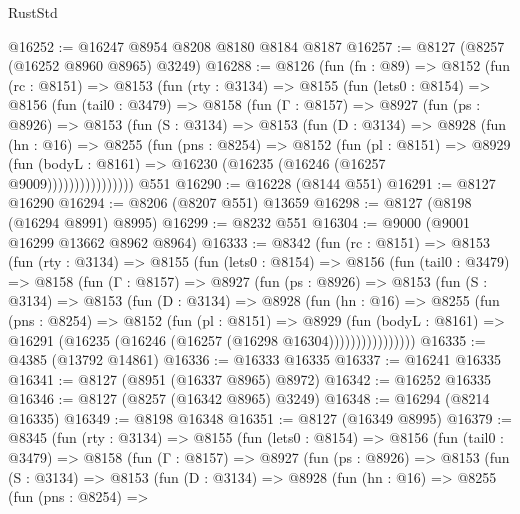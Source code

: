 \begin{lexlean}{RustStd}
\begin{coremodule}
@16252 := @16247 @8954 @8208 @8180 @8184 @8187
@16257 := @8127 (@8257 (@16252 @8960 @8965) @3249)
@16288 := @8126
    (fun (fn : @89) =>
    @8152
      (fun (rc : @8151) =>
      @8153
        (fun (rty : @3134) =>
        @8155
          (fun (lets0 : @8154) =>
          @8156
            (fun (tail0 : @3479) =>
            @8158
              (fun (Γ : @8157) =>
              @8927
                (fun (ps : @8926) =>
                @8153
                  (fun (S : @3134) =>
                  @8153
                    (fun (D : @3134) =>
                    @8928
                      (fun (hn : @16) =>
                      @8255
                        (fun (pns : @8254) =>
                        @8152
                          (fun (pl : @8151) =>
                          @8929
                            (fun (bodyL : @8161) =>
                            @16230 (@16235 (@16246 (@16257 @9009))))))))))))))))
    @551
@16290 := @16228 (@8144 @551)
@16291 := @8127 @16290
@16294 := @8206 (@8207 @551) @13659
@16298 := @8127 (@8198 (@16294 @8991) @8995)
@16299 := @8232 @551
@16304 := @9000 (@9001 @16299 @13662 @8962 @8964)
@16333 := @8342
    (fun (rc : @8151) =>
    @8153
      (fun (rty : @3134) =>
      @8155
        (fun (lets0 : @8154) =>
        @8156
          (fun (tail0 : @3479) =>
          @8158
            (fun (Γ : @8157) =>
            @8927
              (fun (ps : @8926) =>
              @8153
                (fun (S : @3134) =>
                @8153
                  (fun (D : @3134) =>
                  @8928
                    (fun (hn : @16) =>
                    @8255
                      (fun (pns : @8254) =>
                      @8152
                        (fun (pl : @8151) =>
                        @8929
                          (fun (bodyL : @8161) =>
                          @16291 (@16235 (@16246 (@16257 (@16298 @16304))))))))))))))))
@16335 := @4385 (@13792 @14861)
@16336 := @16333 @16335
@16337 := @16241 @16335
@16341 := @8127 (@8951 (@16337 @8965) @8972)
@16342 := @16252 @16335
@16346 := @8127 (@8257 (@16342 @8965) @3249)
@16348 := @16294 (@8214 @16335)
@16349 := @8198 @16348
@16351 := @8127 (@16349 @8995)
@16379 := @8345
    (fun (rty : @3134) =>
    @8155
      (fun (lets0 : @8154) =>
      @8156
        (fun (tail0 : @3479) =>
        @8158
          (fun (Γ : @8157) =>
          @8927
            (fun (ps : @8926) =>
            @8153
              (fun (S : @3134) =>
              @8153
                (fun (D : @3134) =>
                @8928
                  (fun (hn : @16) =>
                  @8255
                    (fun (pns : @8254) =>

\end{coremodule}
\end{lexlean}
